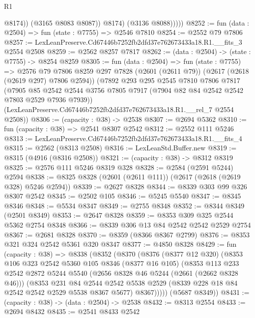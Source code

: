 \begin{lexlean}{R1}
\begin{coremodule}
                    @8174))
                (@3165 @8083 @8087))
              @8174)
            (@3136 @8088)))))
@8252 := fun (data : @2504) => fun (state : @7755) => @2546 @7810
@8254 := @2552 @79 @7806
@8257 := LexLeanPreserve.Cd67446b7252fb2dfd37e762673433a18.R1.__fits_3 @2554 @2508
@8259 := @2562 @8257 @7817
@8262 := (data : @2504) -> (state : @7755) -> @8254 @8259
@8305 := fun (data : @2504) =>
  fun (state : @7755) =>
  @2576
    @79
    @7806
    @8259
    @297
    @7828
    (@2601 (@2611 @79))
    (@2617 (@2618 (@2619 @297) @7806 @2594))
    (@7892
      @293
      @295
      @2545
      @7810
      @7806
      @7817
      (@7905 @85 @2542 @2544 @3756 @7805 @7917 (@7904 @82 @84 @2542 @2542 @7803 @2529 @7936 @7939))
      (LexLeanPreserve.Cd67446b7252fb2dfd37e762673433a18.R1.__rel_7 @2554 @2508))
@8306 := (capacity : @38) -> @2538
@8307 := @2694 @5362
@8310 := fun (capacity : @38) => @2541 @8307 @2542
@8312 := @2552 @111 @5246
@8313 := LexLeanPreserve.Cd67446b7252fb2dfd37e762673433a18.R1.__fits_4
@8315 := @2562 (@8313 @2508)
@8316 := LexLeanStd.Buffer.new
@8319 := @8315 (@4916 (@8316 @2508))
@8321 := (capacity : @38) -> @8312 @8319
@8325 := @2576 @111 @5246 @8319 @328
@8328 := @2584 (@2591 @5244) @2594
@8338 := @8325 @8328 (@2601 (@2611 @111)) (@2617 (@2618 (@2619 @328) @5246 @2594))
@8339 := @2627 @8328
@8344 := @8339 @303 @99 @326 @8307 @2542
@8345 := @2502 @105
@8346 := @5245 @5540
@8347 := @8345 @8346
@8348 := @5534 @8347
@8349 := @2755 @8348
@8352 := @8344 @8349 (@2501 @8349)
@8353 := @2647 @8328
@8359 := @8353 @309 @325 @2544 @5362 @2754 @8348
@8366 := @8339 @306 @13 @84 @2542 @2542 @2529 @2754
@8367 := @2681 @8328
@8370 := @8359 (@8366 @8367 @2799)
@8376 := @8353 @321 @324 @2542 @5361 @320 @8347
@8377 := @4850 @8328
@8429 := fun (capacity : @38) =>
  @8338
    (@8352
      (@8370
        (@8376
          (@8377 @12 @320)
          (@8353
            @106
            @323
            @2542
            @5360
            @105
            @8346
            (@8377 @16 @105)
            (@8353
              @113
              @233
              @2542
              @2872
              @5244
              @5540
              (@2656 @8328 @46 @5244 (@2661 (@2662 @8328 @46)))
              (@8353
                @231
                @84
                @2544
                @2542
                @5538
                @2529
                (@8339 @228 @18 @84 @2542 @2542 @2529 @5538 @8367 @5677)
                @8367)))))
      (@5687 @8349))
@8431 := (capacity : @38) -> (data : @2504) -> @2538
@8432 := @8313 @2554
@8433 := @2694 @8432
@8435 := @2541 @8433 @2542

\end{coremodule}
\end{lexlean}
